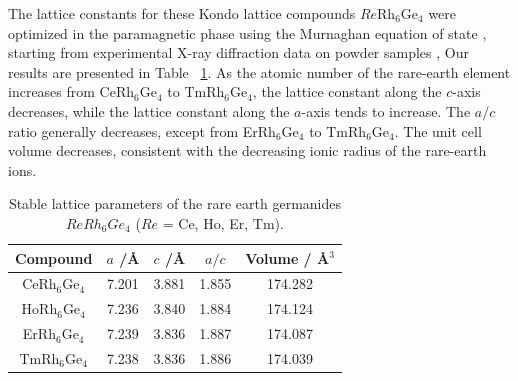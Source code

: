 \documentclass[preprint,12pt]{elsarticle}
\begin{document}
The lattice constants for these Kondo lattice compounds $Re$Rh$_6$Ge$_4$ were optimized in the paramagnetic phase using the Murnaghan equation of state \cite{murnaghan1944compressibility},%
starting from experimental X-ray diffraction data on powder samples \cite{Vosswinkel2013_Zfauac639-2623},%
Our results are presented in Table ~\ref{tab:table1}. As the atomic number of the rare-earth element increases from CeRh$_6$Ge$_4$ to TmRh$_6$Ge$_4$, the lattice constant along the $c$-axis decreases, while the lattice constant along the $a$-axis tends to increase. The $a/c$ ratio generally decreases, except from ErRh$_6$Ge$_4$ to TmRh$_6$Ge$_4$. The unit cell volume decreases, consistent with the decreasing ionic radius of the rare-earth ions.
	\begin{table}%
		\caption{\label{tab:table1}%
			Stable lattice parameters of the rare earth germanides $ReRh_6Ge_4$ ($Re$ = Ce, Ho, Er, Tm). }
			\begin{tabular}{ccccc}
				\toprule
				Compound& $a$ /\r A  &$c$ /\r A &$a/c$ &Volume / \r A$^3$\\ \hline
				CeRh$_6$Ge$_4$ & 7.201 & 3.881 & 1.855 & 174.282\\
				HoRh$_6$Ge$_4$ & 7.236 & 3.840 & 1.884 & 174.124\\
				ErRh$_6$Ge$_4$ & 7.239 & 3.836 & 1.887 & 174.087\\
				TmRh$_6$Ge$_4$ & 7.238 & 3.836 & 1.886 & 174.039\\
				\bottomrule
			\end{tabular}
	\end{table}
		
\end{document}
